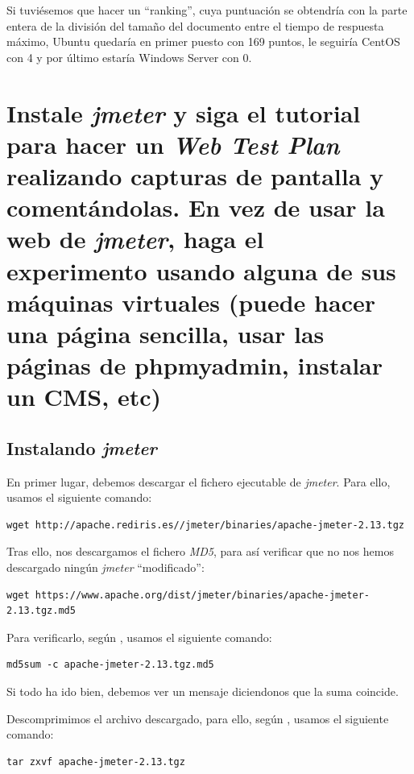 \documentclass[10pt,a4paper,spanish]{article}
\numberwithin{equation}{section} %
\numberwithin{figure}{section} %
\numberwithin{table}{section} %
\begin{document}
Si tuviésemos que hacer un ``ranking'', cuya puntuación se obtendría con la parte entera de la división del tamaño del documento entre el tiempo de respuesta máximo, Ubuntu quedaría en primer puesto con 169 puntos, le seguiría CentOS con 4 y por último estaría Windows Server con 0.

\section{Instale \textit{jmeter} y siga el tutorial para hacer un \textit{Web Test Plan} realizando capturas de pantalla y comentándolas. En vez de usar la web de \textit{jmeter}, haga el experimento usando alguna de sus máquinas virtuales (puede hacer una página sencilla, usar las páginas de phpmyadmin, instalar un CMS, etc)}
\subsection{Instalando \textit{jmeter}}
En primer lugar, debemos descargar el fichero ejecutable de \textit{jmeter}. Para ello, usamos el siguiente comando:

\begin{verbatim}
wget http://apache.rediris.es//jmeter/binaries/apache-jmeter-2.13.tgz
\end{verbatim}

Tras ello, nos descargamos el fichero \textit{MD5}, para así verificar que no nos hemos descargado ningún \textit{jmeter} ``modificado'':
\begin{verbatim}
wget https://www.apache.org/dist/jmeter/binaries/apache-jmeter-2.13.tgz.md5
\end{verbatim}

Para verificarlo, según \cite{md5apache}, usamos el siguiente comando:
\begin{verbatim}
md5sum -c apache-jmeter-2.13.tgz.md5
\end{verbatim}

Si todo ha ido bien, debemos ver un mensaje diciendonos que la suma coincide.

Descomprimimos el archivo descargado, para ello, según \cite{tar}, usamos el siguiente comando:
\begin{verbatim}
tar zxvf apache-jmeter-2.13.tgz
\end{verbatim}
\end{document}

